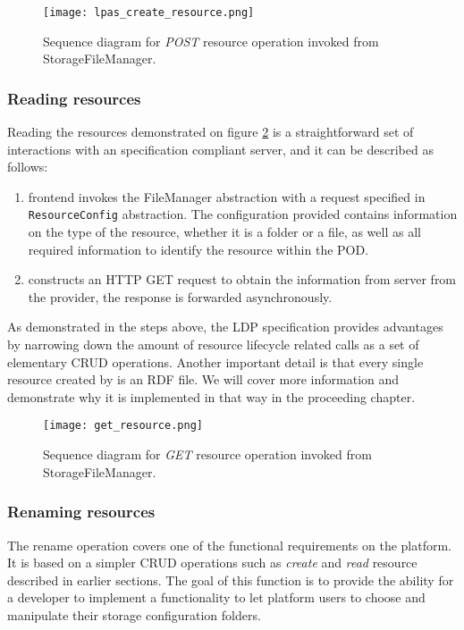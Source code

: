 \begin{figure}[h]
\centering
\texttt{[image: lpas\_create\_resource.png]}
\caption{Sequence diagram for \textit{POST} resource operation invoked from StorageFileManager.}
\label{fig:lpas_create_resource}
\end{figure}

\subsubsection{Reading resources}

Reading the resources demonstrated on figure \ref{fig:lps_get_resource_sequence} is a straightforward set of interactions with an \solid{} specification compliant server, and it can be described as follows:

\begin{enumerate}
    \item \lpa{} frontend invokes the FileManager abstraction with a request specified in \texttt{ResourceConfig} abstraction. The configuration provided contains information on the type of the resource, whether it is a folder or a file, as well as all required information to identify the resource within the POD.
    \item \lpas{} constructs an HTTP GET request to obtain the information from \solid{} server from the provider, the response is forwarded asynchronously.
\end{enumerate}


As demonstrated in the steps above, the LDP specification provides advantages by narrowing down the amount of resource lifecycle related calls as a set of elementary CRUD operations. Another important detail is that every single resource created by \lpas{} is an RDF file. We will cover more information and demonstrate why it is implemented in that way in the proceeding chapter.  
 
\begin{figure}[h]
\centering
\texttt{[image: get\_resource.png]}
\caption{Sequence diagram for \textit{GET} resource operation invoked from StorageFileManager.}
\label{fig:lps_get_resource_sequence}
\end{figure}

\subsubsection{Renaming resources}

The rename operation covers one of the functional requirements on the \lpa{} platform. It is based on a simpler CRUD operations such as \textit{create} and \textit{read} resource described in earlier sections. The goal of this function is to provide the ability for a \lpa{} developer to implement a functionality to let \lpa{} platform users to choose and manipulate their storage configuration folders. 

